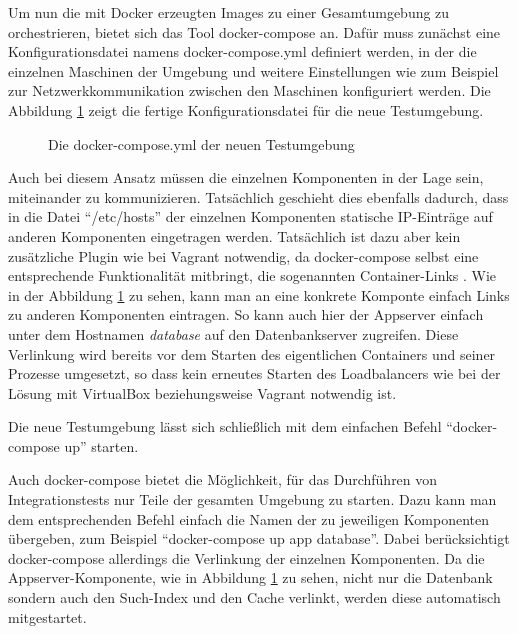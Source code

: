 Um nun die mit Docker erzeugten Images zu einer Gesamtumgebung zu orchestrieren, bietet sich das Tool docker-compose \citep[Vgl.][]{dockercompose} an. Dafür muss zunächst eine Konfigurationsdatei namens docker-compose.yml definiert werden, in der die einzelnen Maschinen der Umgebung und weitere Einstellungen wie zum Beispiel zur Netzwerkkommunikation zwischen den Maschinen konfiguriert werden. Die Abbildung \ref{dockercomposeyml} zeigt die fertige Konfigurationsdatei für die neue Testumgebung.

\begin{figure}[!ht]
  \begin{center}
    \caption{Die docker-compose.yml der neuen Testumgebung}
    \label{dockercomposeyml}
  \end{center}
\end{figure}

Auch bei diesem Ansatz müssen die einzelnen Komponenten in der Lage sein, miteinander zu kommunizieren. Tatsächlich geschieht dies ebenfalls dadurch, dass in die Datei "`/etc/hosts"' der einzelnen Komponenten statische IP-Einträge auf anderen Komponenten eingetragen werden. Tatsächlich ist dazu aber kein zusätzliche Plugin wie bei Vagrant notwendig, da docker-compose selbst eine entsprechende Funktionalität mitbringt, die sogenannten Container-Links \citep[Vgl.][]{dockerlinks}. Wie in der Abbildung \ref{dockercomposeyml} zu sehen, kann man an eine konkrete Komponte einfach Links zu anderen Komponenten eintragen. So kann auch hier der Appserver einfach unter dem Hostnamen \textit{database} auf den Datenbankserver zugreifen. Diese Verlinkung wird bereits vor dem Starten des eigentlichen Containers und seiner Prozesse umgesetzt, so dass kein erneutes Starten des Loadbalancers wie bei der Lösung mit VirtualBox beziehungsweise Vagrant notwendig ist.

Die neue Testumgebung lässt sich schließlich mit dem einfachen Befehl "`docker-compose up"' starten.

Auch docker-compose bietet die Möglichkeit, für das Durchführen von Integrationstests nur Teile der gesamten Umgebung zu starten. Dazu kann man dem entsprechenden Befehl einfach die Namen der zu jeweiligen Komponenten übergeben, zum Beispiel "`docker-compose up app database"'. Dabei berücksichtigt docker-compose allerdings die Verlinkung der einzelnen Komponenten. Da die Appserver-Komponente, wie in Abbildung \ref{dockercomposeyml} zu sehen, nicht nur die Datenbank sondern auch den Such-Index und den Cache verlinkt, werden diese automatisch mitgestartet.


